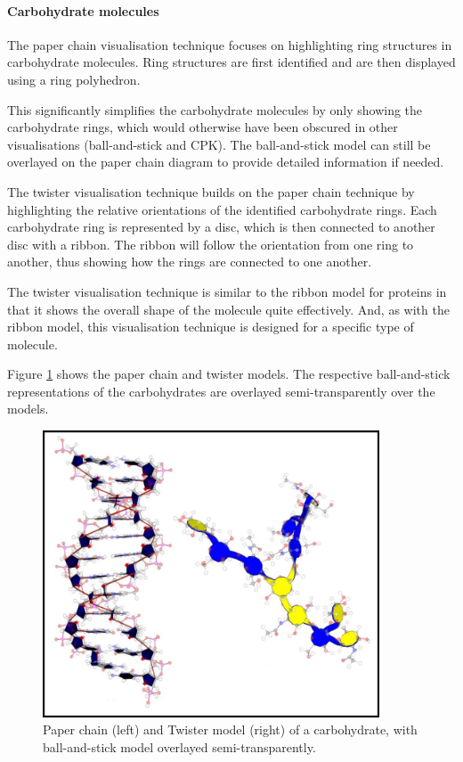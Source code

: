 
\paragraph{Carbohydrate molecules}

The paper chain visualisation technique \citep{kuttel06} focuses on
highlighting ring structures in carbohydrate molecules. Ring structures are
first identified and are then displayed using a ring polyhedron.

This significantly simplifies the carbohydrate molecules by only showing the
carbohydrate rings, which would otherwise have been obscured in other
visualisations (ball-and-stick and CPK). The ball-and-stick model can still be
overlayed on the paper chain diagram to provide detailed information if needed.

The twister visualisation technique \citep{kuttel06} builds on the paper chain
technique by highlighting the relative orientations of the identified
carbohydrate rings. Each carbohydrate ring is represented by a disc, which is
then connected to another disc with a ribbon. The ribbon will follow the
orientation from one ring to another, thus showing how the rings are connected
to one another.

The twister visualisation technique is similar to the ribbon model for proteins
in that it shows the overall shape of the molecule quite effectively. And, as
with the ribbon model, this visualisation technique is designed for a specific
type of molecule.

Figure \ref{fig:background_chain_twister} shows the paper chain and twister
models. The respective ball-and-stick representations of the carbohydrates are
overlayed semi-transparently over the models.

\begin{figure}
  \begin{center}
    \includegraphics[width=100mm]{chain_twister}
  \end{center}
  \caption{Paper chain (left) and Twister model (right) of a carbohydrate, with
  ball-and-stick model overlayed semi-transparently.}
  \label{fig:background_chain_twister}
\end{figure}

